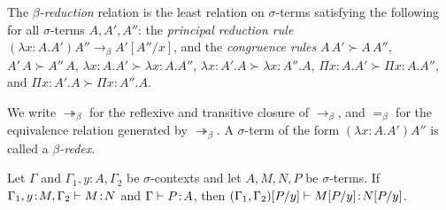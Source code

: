 \documentclass[reqno, twoside]{article}
\begin{document}
    \begin{definition}
        The \textit{$\beta$-reduction} relation is the least relation on $\sigma$-terms satisfying the following for all $\sigma$-terms $A,A',A''$: the \textit{principal reduction rule} $(\lambda x\!:\!A.A')A''\rightarrow_\beta A'[A''/x]$, and the \textit{congruence rules} $A\,A'\succ A\,A''$, $A'\,A\succ A''\,A$, $\lambda x\!:\!A.A'\succ\lambda x\!:\!A.A''$, $\lambda x\!:\!A'.A\succ\lambda x\!:\!A''.A$, $\Pi x\!:\!A.A'\succ\Pi x\!:\!A.A''$, and $\Pi x\!:\!A'.A\succ\Pi x\!:\!A''.A$.
    \end{definition}

    \begin{notation}
        We write $\twoheadrightarrow_\beta$ for the reflexive and transitive closure of $\rightarrow_\beta$, and $=_\beta$ for the equivalence relation generated by $\twoheadrightarrow_\beta$. A $\sigma$-term of the form $(\lambda x\!:\!A.A')A''$ is called a \textit{$\beta$-redex}.
    \end{notation}

    \begin{lemma}\label{lem:substitution}
        Let $\Gamma$ and $\Gamma_1,y\!:\!A,\Gamma_2$ be $\sigma$-contexts and let $A,M,N,P$ be $\sigma$-terms. If $\Gamma_1,y\!:\!M,\Gamma_2\vdash M\!:\!N$ and $\Gamma\vdash P\!:\!A$, then $(\Gamma_1,\Gamma_2)[P/y]\vdash M[P/y]\!:\!N[P/y]$.
    \end{lemma}
\end{document}
